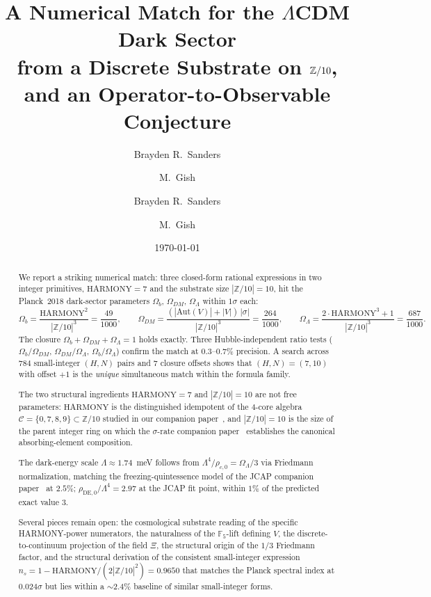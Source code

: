 \documentclass[11pt,reqno]{amsart}
\title[Dark-Sector Trinity from Z/10]
{A Numerical Match for the $\Lambda$CDM Dark Sector \\
 from a Discrete Substrate on $\Z/10$, \\
 and an Operator-to-Observable Conjecture}
\author{Brayden R.\ Sanders \and M.\ Gish}
\author{Brayden R.\ Sanders \and M.\ Gish}
\date{\today}
\theoremstyle{plain}
\theoremstyle{definition}
\theoremstyle{remark}
\newcommand{\Z}{\mathbb{Z}}
\newcommand{\F}{\mathbb{F}}
\newcommand{\Aut}{\mathrm{Aut}}
\begin{document}
\begin{abstract}
We report a striking numerical match: three closed-form rational
expressions in two integer primitives, $\mathrm{HARMONY} = 7$ and
the substrate size $|\Z/10| = 10$, hit the Planck~2018
dark-sector parameters
$\Omega_b$, $\Omega_{DM}$, $\Omega_\Lambda$ within $1\sigma$ each:
\[
  \Omega_b = \frac{\mathrm{HARMONY}^{2}}{|\Z/10|^{3}} = \frac{49}{1000},\qquad
  \Omega_{DM} = \frac{(|\Aut(V)| + |V|)\,|\sigma|}{|\Z/10|^{3}} = \frac{264}{1000},\qquad
  \Omega_\Lambda = \frac{2\cdot\mathrm{HARMONY}^{3} + 1}{|\Z/10|^{3}} = \frac{687}{1000}.
\]
The closure $\Omega_b + \Omega_{DM} + \Omega_\Lambda = 1$ holds
exactly. Three Hubble-independent ratio tests
($\Omega_b/\Omega_{DM}$, $\Omega_{DM}/\Omega_\Lambda$,
$\Omega_b/\Omega_\Lambda$) confirm the match at $0.3$--$0.7\%$
precision. A search across $784$ small-integer $(H, N)$ pairs and
$7$ closure offsets shows that $(H, N) = (7, 10)$ with offset
$+1$ is the \emph{unique} simultaneous match within the formula
family.

The two structural ingredients $\mathrm{HARMONY} = 7$ and
$|\Z/10| = 10$ are not free parameters: $\mathrm{HARMONY}$ is the
distinguished idempotent of the $4$-core algebra
$\mathcal{C} = \{0, 7, 8, 9\} \subset \Z/10$ studied in our
companion paper~\cite{SandersGish2026FourCore}, and
$|\Z/10| = 10$ is the size of the parent integer ring on which the
$\sigma$-rate companion paper~\cite{SandersGish2026SigmaRate}
establishes the canonical absorbing-element composition.

The dark-energy scale $\Lambda \approx 1.74$~meV follows from
$\Lambda^{4}/\rho_{c,0} = \Omega_\Lambda/3$ via Friedmann
normalization, matching the freezing-quintessence model of the
JCAP companion paper~\cite{SandersGish2026JCAP} at $2.5\%$;
$\rho_{\mathrm{DE},0}/\Lambda^{4} = 2.97$ at the JCAP fit point,
within $1\%$ of the predicted exact value $3$.

Several pieces remain open: the cosmological substrate reading of
the specific HARMONY-power numerators, the naturalness of the
$\F_5$-lift defining $V$, the discrete-to-continuum projection
of the field $\Xi$, the structural origin of the $1/3$ Friedmann
factor, and the structural derivation of the consistent
small-integer expression
$n_s = 1 - \mathrm{HARMONY}/(2|\Z/10|^{2}) = 0.9650$ that
matches the Planck spectral index at $0.024\sigma$ but lies
within a $\sim 2.4\%$ baseline of similar small-integer forms.


\end{abstract}
\end{document}
